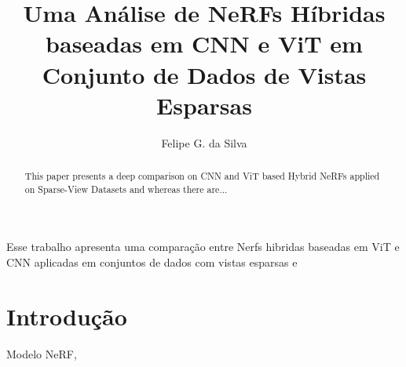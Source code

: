 \documentclass[12pt]{article}
\title{Uma Análise de NeRFs Híbridas baseadas em CNN e ViT em Conjunto de Dados de Vistas Esparsas}
\author{Felipe G. da Silva\inst{1}}
\begin{document}
 

\maketitle

\begin{abstract}
  This paper presents a deep comparison on CNN and ViT based Hybrid NeRFs applied on Sparse-View Datasets and whereas there are...
  

\end{abstract}

\begin{resumo}
  Esse trabalho apresenta uma comparação entre Nerfs hibridas baseadas em ViT e CNN aplicadas em conjuntos de dados com vistas esparsas e 
  
  

\end{resumo}

\section{Introdução}

Modelo NeRF,


\end{document}
